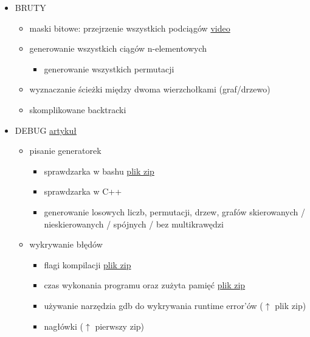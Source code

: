 \documentclass[15pt]{article}
\begin{document}
\begin{itemize}
    \item BRUTY
    \begin{itemize}
        \item maski bitowe: przejrzenie wszystkich podciągów \href{http://solve.edu.pl/~sparingi/resources}{video}
        \item generowanie wszystkich ciągów n-elementowych
        \begin{itemize}
            \item generowanie wszystkich permutacji
        \end{itemize}
        \item wyznaczanie ścieżki między dwoma wierzchołkami (graf/drzewo)
        \item skomplikowane backtracki
    \end{itemize}
    
    \item DEBUG \href{https://sim.ugo.si/api/download/file/jySGuWzthXf0VT9sONUAjlcojsnaUM}{artykuł}
    \begin{itemize}
        \item pisanie generatorek
        \begin{itemize}
            \item sprawdzarka w bashu \href{https://sim.ugo.si/api/download/file/W7738Bo24gH14MTXjiImqaiwG4iNy8}{plik zip}
            \item sprawdzarka w C++
            \item generowanie losowych liczb, permutacji, drzew, grafów skierowanych / nieskierowanych / spójnych / bez multikrawędzi
        \end{itemize}
        \item wykrywanie błędów
        \begin{itemize}
            \item flagi kompilacji \href{https://sim.ugo.si/api/download/file/1fhJzfNSSRaV0Yax9HAXpwq8xzcQka}{plik zip}
            \item czas wykonania programu oraz zużyta pamięć \href{https://sim.ugo.si/api/download/file/PurVW2KifPwKWUyH9N7NC2PXAnCYZv}{plik zip}
            \item używanie narzędzia gdb do wykrywania runtime error'ów ($\uparrow$ plik zip)
            \item nagłówki ($\uparrow$ pierwszy zip)
        \end{itemize}
    \end{itemize}
    

\end{itemize}
\end{document}
